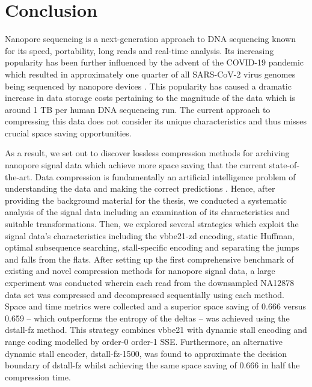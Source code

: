 \chapter{Conclusion} \label{chap:conclusion}

Nanopore sequencing is a next-generation approach to DNA sequencing known for
its speed, portability, long reads and real-time analysis. Its increasing
popularity has been further influenced by the advent of the COVID-19 pandemic
which resulted in approximately one quarter of all SARS-CoV-2 virus genomes
being sequenced by nanopore devices \cite{lara}. This popularity has caused a
dramatic increase in data storage costs pertaining to the magnitude of the data
which is around 1 TB per human DNA sequencing run.
The current approach to compressing this data does not consider its
unique characteristics and thus misses crucial space saving opportunities.

As a result, we set out to discover lossless compression methods for archiving
nanopore signal data which achieve more space saving that the current
state-of-the-art.
Data compression is fundamentally an artificial intelligence problem of
understanding the data and making the correct predictions \cite{mahoney}. Hence, after
providing the background material for the thesis, we conducted a systematic
analysis of the signal data including an examination of its characteristics and
suitable transformations.
Then, we explored several strategies which exploit the signal data's
characteristics including the vbbe21-zd encoding, static Huffman, optimal
subsequence searching, stall-specific encoding and separating the jumps and
falls from the flats.
After setting up the first comprehensive benchmark of existing and novel
compression methods for nanopore signal data, a large experiment was conducted
wherein each read from the downsampled NA12878 data set was compressed and
decompressed sequentially using each method.
Space and time metrics were collected and a superior space saving of 0.666
versus 0.659 -- which outperforms the entropy of the deltas -- was achieved
using the dstall-fz method. This strategy combines vbbe21 with dynamic stall
encoding and range coding modelled by order-0 order-1 SSE. Furthermore, an
alternative dynamic stall encoder, dstall-fz-1500, was found to approximate the
decision boundary of dstall-fz whilst achieving the same space saving of 0.666 in
half the compression time.
